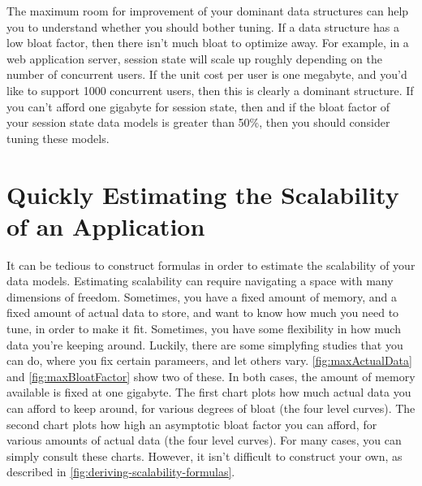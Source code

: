 The maximum room for improvement of your dominant data structures can help you
to understand whether you should bother tuning. If a data structure has a low bloat
factor, then there isn't much bloat to optimize away. For example, in a web
application server, session state will scale up roughly depending on the number
of concurrent users. If the unit cost per user is one megabyte, and you'd like
to support 1000 concurrent users, then this is clearly a dominant structure. If
you can't afford one gigabyte for session state, then and if the bloat factor of
your session state data models is greater than 50\%, then you should consider
tuning these models.

\section{Quickly Estimating the Scalability of an Application}

It can be tedious to construct formulas in order to estimate the scalability of
your data models. Estimating scalability can require navigating a space with
many dimensions of freedom. Sometimes, you have a fixed amount of memory, and a
fixed amount of actual data to store, and want to know how much you need to
tune, in order to make it fit. Sometimes, you have some flexibility in how much
data you're keeping around. Luckily, there are some simplyfing studies that you
can do, where you fix certain parameers, and let others vary.
\autoref{fig:maxActualData} and \autoref{fig:maxBloatFactor} show two of these.
In both cases, the amount of memory available is fixed at one gigabyte. The
first chart plots how much actual data you can afford to keep around, for
various degrees of bloat (the four level curves). The second chart plots how
high an asymptotic bloat factor you can afford, for various amounts of actual
data (the four level curves). For many cases, you can simply consult these
charts. However, it isn't difficult to construct your own, as described in
\autoref{fig:deriving-scalability-formulas}.


